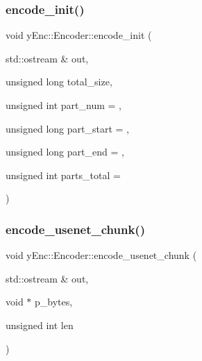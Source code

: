 \hypertarget{classy_enc_1_1_encoder_adfb89ae4d9d5614098ad78ae436b12fa}{}\label{classy_enc_1_1_encoder_adfb89ae4d9d5614098ad78ae436b12fa} 
\subsubsection{\texorpdfstring{encode\+\_\+init()}{encode\_init()}}
{\footnotesize\ttfamily void y\+Enc\+::\+Encoder\+::encode\+\_\+init (\begin{DoxyParamCaption}\item[{std\+::ostream \&}]{out,  }\item[{unsigned long}]{total\+\_\+size,  }\item[{unsigned int}]{part\+\_\+num = {},  }\item[{unsigned long}]{part\+\_\+start = {},  }\item[{unsigned long}]{part\+\_\+end = {},  }\item[{unsigned int}]{parts\+\_\+total = {} }\end{DoxyParamCaption})}

\hypertarget{classy_enc_1_1_encoder_ab0d4bf6c1509244c45b32376a1f14878}{}\label{classy_enc_1_1_encoder_ab0d4bf6c1509244c45b32376a1f14878} 
\subsubsection{\texorpdfstring{encode\+\_\+usenet\+\_\+chunk()}{encode\_usenet\_chunk()}}
{\footnotesize\ttfamily void y\+Enc\+::\+Encoder\+::encode\+\_\+usenet\+\_\+chunk (\begin{DoxyParamCaption}\item[{std\+::ostream \&}]{out,  }\item[{void $\ast$}]{p\+\_\+bytes,  }\item[{unsigned int}]{len }\end{DoxyParamCaption})}

\hypertarget{classy_enc_1_1_encoder_a73015158db830e91ba29bb9762a4ba1f}{}\label{classy_enc_1_1_encoder_a73015158db830e91ba29bb9762a4ba1f} 
